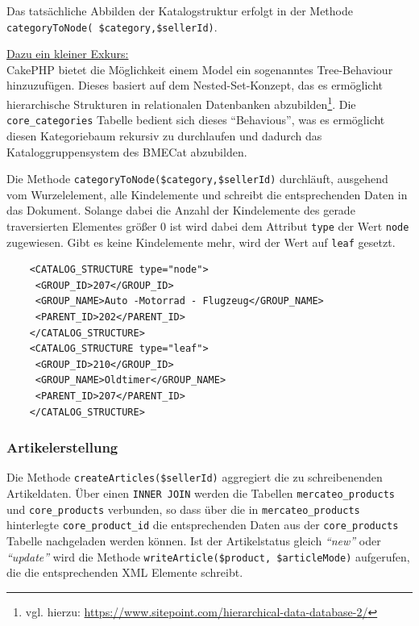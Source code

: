 	 Das tatsächliche Abbilden der Katalogstruktur erfolgt in der Methode \texttt{categoryToNode(\ \$category,\$sellerId)}.
	 
	\begin{addmargin}[1cm]{1cm}
	\underline{Dazu ein kleiner Exkurs:}\\
		 CakePHP bietet die Möglichkeit einem Model ein sogenanntes Tree-Behaviour hinzuzufügen. Dieses basiert auf dem Nested-Set-Konzept, das es ermöglicht hierarchische Strukturen in relationalen Datenbanken abzubilden\footnote{vgl. hierzu: \url{https://www.sitepoint.com/hierarchical-data-database-2/}}. Die \texttt{core\_categories} Tabelle bedient sich dieses \enquote{Behavious}, was es ermöglicht diesen Kategoriebaum rekursiv zu durchlaufen und dadurch das Kataloggruppensystem des BMECat abzubilden.
	\end{addmargin}
	
	
	Die Methode \texttt{categoryToNode(\$category,\$sellerId)} durchläuft, ausgehend vom Wurzelelement, alle Kindelemente und schreibt die entsprechenden Daten in das Dokument. Solange dabei die Anzahl der Kindelemente des gerade traversierten Elementes größer 0 ist wird dabei dem Attribut \texttt{type} der Wert \texttt{node} zugewiesen. Gibt es keine Kindelemente mehr, wird der Wert auf \texttt{leaf} gesetzt. 
	\lstset{language=xml}
	\begin{lstlisting}
	<CATALOG_STRUCTURE type="node">
	 <GROUP_ID>207</GROUP_ID>
	 <GROUP_NAME>Auto -Motorrad - Flugzeug</GROUP_NAME>
	 <PARENT_ID>202</PARENT_ID>
	</CATALOG_STRUCTURE>
	<CATALOG_STRUCTURE type="leaf">
	 <GROUP_ID>210</GROUP_ID>
	 <GROUP_NAME>Oldtimer</GROUP_NAME>
	 <PARENT_ID>207</PARENT_ID>
	</CATALOG_STRUCTURE>
	\end{lstlisting}
	
	\subsubsection{Artikelerstellung}
	
	Die Methode \texttt{createArticles(\$sellerId)} aggregiert die zu schreibenenden Artikeldaten. Über einen \texttt{INNER JOIN} werden die Tabellen \texttt{mercateo\_products} und \texttt{core\_products} verbunden, so dass über die in \texttt{mercateo\_products} hinterlegte \texttt{core\_product\_id} die entsprechenden Daten aus der \texttt{core\_products} Tabelle nachgeladen werden können. 
	Ist der Artikelstatus gleich \textit{\enquote{new}} oder \textit{\enquote{update}} wird die Methode \texttt{writeArticle(\$product, \$articleMode)} aufgerufen, die die entsprechenden XML Elemente schreibt. \\
		
